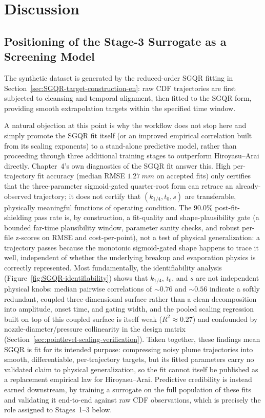 \section{Discussion}

\subsection{Positioning of the Stage-3 Surrogate as a Screening Model}

The synthetic dataset is generated by the reduced-order \(\mathrm{SGQR}\) fitting in Section~\ref{sec:SGQR-target-construction-en}: raw CDF trajectories are first subjected to cleansing and temporal alignment, then fitted to the \(\mathrm{SGQR}\) form, providing smooth extrapolation targets within the specified time window.

A natural objection at this point is why the workflow does not stop here and simply promote the SGQR fit itself (or an improved empirical correlation built from its scaling exponents) to a stand-alone predictive model, rather than proceeding through three additional training stages to outperform Hiroyasu--Arai directly. Chapter~4's own diagnostics of the SGQR fit answer this. High per-trajectory fit accuracy (median RMSE \(\SI{1.27}{mm}\) on accepted fits) only certifies that the three-parameter sigmoid-gated quarter-root form can retrace an already-observed trajectory; it does not certify that \((k_{1/4},t_0,s)\) are transferable, physically meaningful functions of operating condition. The \(90.0\%\) post-fit-shielding pass rate is, by construction, a fit-quality and shape-plausibility gate (a bounded far-time plausibility window, parameter sanity checks, and robust per-file z-scores on RMSE and cost-per-point), not a test of physical generalization: a trajectory passes because the monotonic sigmoid-gated shape happens to trace it well, independent of whether the underlying breakup and evaporation physics is correctly represented. Most fundamentally, the identifiability analysis (Figure~\ref{fig:SGQR-identifiability}) shows that \(k_{1/4}\), \(t_0\), and \(s\) are not independent physical knobs: median pairwise correlations of \(\sim0.76\) and \(\sim0.56\) indicate a softly redundant, coupled three-dimensional surface rather than a clean decomposition into amplitude, onset time, and gating width, and the pooled scaling regression built on top of this coupled surface is itself weak (\(R^2\approx0.27\)) and confounded by nozzle-diameter/pressure collinearity in the design matrix (Section~\ref{sec:pointlevel-scaling-verification}). Taken together, these findings mean SGQR is fit for its intended purpose: compressing noisy plume trajectories into smooth, differentiable, per-trajectory targets, but its fitted parameters carry no validated claim to physical generalization, so the fit cannot itself be published as a replacement empirical law for Hiroyasu--Arai. Predictive credibility is instead earned downstream, by training a surrogate on the full population of these fits and validating it end-to-end against raw CDF observations, which is precisely the role assigned to Stages~1--3 below.

